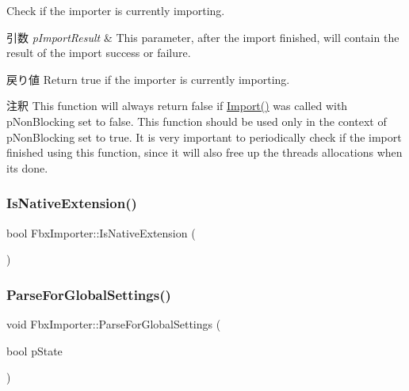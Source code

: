 Check if the importer is currently importing. 
\begin{DoxyParams}{引数}
{\em p\+Import\+Result} & This parameter, after the import finished, will contain the result of the import success or failure. \\
\hline
\end{DoxyParams}
\begin{DoxyReturn}{戻り値}
Return true if the importer is currently importing. 
\end{DoxyReturn}
\begin{DoxyRemark}{注釈}
This function will always return false if \hyperlink{class_fbx_importer_a1c5a7f9ee8a6952c1e039065cfa09659}{Import()} was called with p\+Non\+Blocking set to false. This function should be used only in the context of p\+Non\+Blocking set to true. It is very important to periodically check if the import finished using this function, since it will also free up the thread\textquotesingle{}s allocations when its done. 
\end{DoxyRemark}
\mbox{\label{class_fbx_importer_a27e8f015196b8cd2c549ab688fea09ab}} 
\subsubsection{\texorpdfstring{Is\+Native\+Extension()}{IsNativeExtension()}}
{\footnotesize\ttfamily bool Fbx\+Importer\+::\+Is\+Native\+Extension (\begin{DoxyParamCaption}{ }\end{DoxyParamCaption})\hspace{0.3cm}{\ttfamily [protected]}}

\mbox{\label{class_fbx_importer_a02c8d2c9b66de94b9434bf0225c67cd7}} 
\subsubsection{\texorpdfstring{Parse\+For\+Global\+Settings()}{ParseForGlobalSettings()}}
{\footnotesize\ttfamily void Fbx\+Importer\+::\+Parse\+For\+Global\+Settings (\begin{DoxyParamCaption}\item[{bool}]{p\+State }\end{DoxyParamCaption})}

